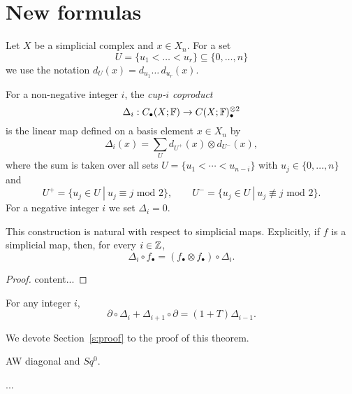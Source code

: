 
\section{New formulas} \label{s:formulas}

Let $X$ be a simplicial complex and $x \in X_n$. For a set
\begin{equation*}
U = \{u_1 < \dots < u_r\} \subseteq \{0, \dots, n\}
\end{equation*}
we use the notation $d_U(x) = d_{u_1} \ldots\, d_{u_r}(x)$.

\begin{definition} \label{d:cup-i coproducts}	
	For a non-negative integer $i$, the \textit{cup-$i$ coproduct}
	\begin{equation*}
	\Delta_i : C_\bullet(X; \mathbb{F}) \to C(X; \mathbb{F})^{\otimes 2}_\bullet
	\end{equation*}
	is the linear map defined on a basis element $x \in X_n$ by
	\begin{equation} \label{equation: simplicial cup-i coproducts}
	\Delta_i(x) = \sum_U d_{U^+}(x) \otimes d_{U^-}(x),
	\end{equation}
	where the sum is taken over all sets $U = \{u_1 < \cdots < u_{n-i}\}$ with $u_j \in \{0, \dots, n\}$ and
	\begin{equation*}
	U^+ = \{u_j \in U\ |\ u_j \equiv j \text{ mod } 2\}, \qquad
	U^- = \{u_j \in U\ |\ u_j \not\equiv j \text{ mod } 2\}.
	\end{equation*}
	For a negative integer $i$ we set $\Delta_i = 0$.
\end{definition}

\begin{lemma}
	This construction is natural with respect to simplicial maps.
	Explicitly, if $f$ is a simplicial map, then, for every $i \in \mathbb{Z}$,
	\begin{equation*}
	\Delta_i \circ f_\bullet = (f_\bullet \otimes f_\bullet) \circ \Delta_i.
	\end{equation*}
\end{lemma}

\begin{proof}
	content...
\end{proof}

\begin{theorem} \label{t:main}
	For any integer $i$,
	\begin{equation} \label{eq: cup-i coproducts boundary relation}
	\partial \circ \Delta_{i} + \Delta_{i+1} \circ \partial = (1 +T ) \Delta_{i-1}.
	\end{equation}
\end{theorem}

We devote Section~\ref{s:proof} to the proof of this theorem.

\begin{example}
	AW diagonal and $Sq^0$.
	
	...
\end{example}